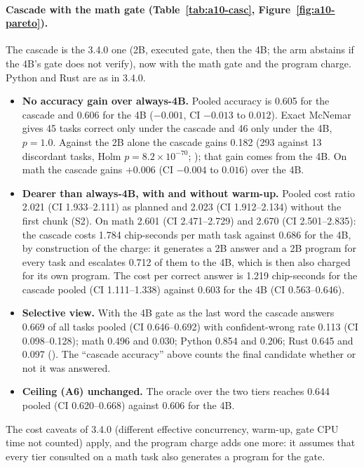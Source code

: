 \documentclass[11pt,a4paper]{article}
\newcommand{\code}[1]{\texttt{\detokenize{#1}}}
\begin{document}
\paragraph{Cascade with the math gate (Table~\ref{tab:a10-casc}, Figure~\ref{fig:a10-pareto}).} The cascade is the
3.4.0 one (2B, executed gate, then the 4B; the arm abstains if the 4B's gate does not verify), now with the math gate and
the program charge. Python and Rust are as in 3.4.0.
\begin{itemize}
\item \textbf{No accuracy gain over always-4B.} Pooled accuracy is 0.605 for the cascade and 0.606 for the 4B
  ($-0.001$, CI $-0.013$ to $0.012$). Exact McNemar gives 45 tasks correct only under the cascade and 46 only under the
  4B, $p=1.0$. Against the 2B alone the cascade gains 0.182 (293 against 13 discordant tasks, Holm
  $p=8.2\times10^{-70}$; \code{paired_tests}); that gain comes from the 4B. On math the cascade gains $+0.006$ (CI
  $-0.004$ to $0.016$) over the 4B.
\item \textbf{Dearer than always-4B, with and without warm-up.} Pooled cost ratio 2.021 (CI 1.933--2.111) as planned and
  2.023 (CI 1.912--2.134) without the first chunk (S2). On math 2.601 (CI 2.471--2.729) and 2.670 (CI 2.501--2.835):
  the cascade costs 1.784 chip-seconds per math task against 0.686 for the 4B, by construction of the charge: it generates a 2B answer and
  a 2B program for every task and escalates 0.712 of them to the 4B, which is then also charged for its own program.
  The cost per correct answer is 1.219 chip-seconds for the cascade pooled (CI 1.111--1.338) against 0.603 for the 4B
  (CI 0.563--0.646).
\item \textbf{Selective view.} With the 4B gate as the last word the cascade answers 0.669 of all tasks pooled
  (CI 0.646--0.692) with confident-wrong rate 0.113 (CI 0.098--0.128); math 0.496 and 0.030; Python 0.854 and 0.206;
  Rust 0.645 and 0.097 (\code{A5.cascade_selective_*}). The ``cascade accuracy'' above counts the final candidate whether
  or not it was answered.
\item \textbf{Ceiling (A6) unchanged.} The oracle over the two tiers reaches 0.644 pooled (CI 0.620--0.668) against
  0.606 for the 4B.
\end{itemize}
The cost caveats of 3.4.0 (different effective concurrency, warm-up, gate CPU time not counted) apply, and the program
charge adds one more: it assumes that every tier consulted on a math task also generates a program for the gate.
\end{document}

